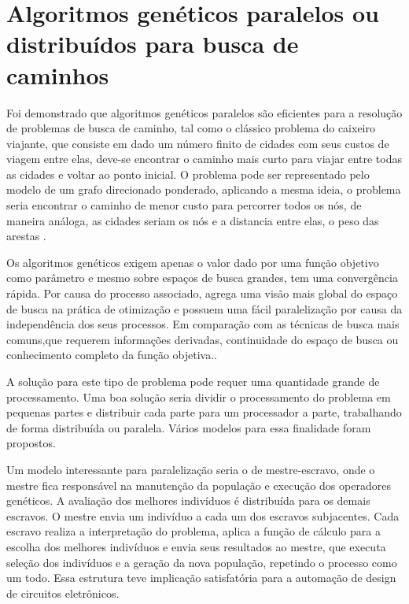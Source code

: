 


\section{Algoritmos genéticos paralelos ou distribuídos para busca de caminhos}

Foi demonstrado que algoritmos genéticos paralelos são eficientes para a resolução de problemas de busca de caminho, tal como o clássico problema do caixeiro viajante, que consiste em dado um número finito de cidades com seus custos de viagem entre elas, deve-se encontrar o caminho mais curto para viajar entre todas as cidades e voltar ao ponto inicial. O problema pode ser representado pelo modelo de um grafo direcionado ponderado, aplicando a mesma ideia, o problema seria encontrar o caminho de menor custo para percorrer todos os nós, de maneira análoga, as cidades seriam os nós e a distancia entre elas, o peso das arestas \cite{Jason}\cite{Alaoui}\cite{Heinz}.

Os algoritmos genéticos exigem apenas o valor dado por uma função objetivo como parâmetro e mesmo sobre espaços de busca grandes, tem uma convergência rápida. Por causa do processo associado, agrega uma visão mais global do espaço de busca na prática de otimização e possuem uma fácil paralelização por causa da independência dos seus processos. Em comparação com as técnicas de busca mais comuns,que requerem informações derivadas, continuidade do espaço de busca ou conhecimento completo da função objetiva.\cite{Vilson}.

A solução para este tipo de problema pode requer uma quantidade grande de processamento. Uma boa solução seria dividir o processamento do problema em pequenas partes e distribuir cada parte para um processador a parte, trabalhando de forma distribuída ou paralela. Vários modelos para essa finalidade foram propostos.

Um modelo interessante para paralelização seria o de mestre-escravo, onde o mestre fica responsável na manutenção da população e execução dos operadores genéticos. A avaliação dos melhores indivíduos é distribuída para os demais escravos. O mestre envia um indivíduo a cada um dos escravos subjacentes. Cada escravo realiza a interpretação do problema, aplica a função de cálculo para a escolha dos melhores indivíduos e envia seus resultados ao mestre, que executa seleção dos indivíduos e a geração da nova população, repetindo o processo como um todo. Essa estrutura teve implicação satisfatória para a automação de design de circuitos eletrônicos. \cite{Jason}

